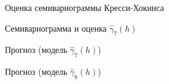 \begin{figure}[H]
\caption{Оценка семивариограммы Кресси-Хокинса}
\label{img:robust-variogram}
\end{figure}

\begin{figure}[H]
\caption{Семивариограмма и оценка $ \widehat{\gamma}_7(h) $}
\label{img:auto-class-modeled}
\end{figure}

\begin{figure}[H]
\caption{Прогноз (модель $ \widehat{\gamma}_7(h) $)}
\label{img:auto-class-20-pred}
\end{figure}

\begin{figure}[H]
\caption{Прогноз (модель $ \widehat{\gamma}_8(h) $)}
\label{img:auto-class-26-pred}
\end{figure}

